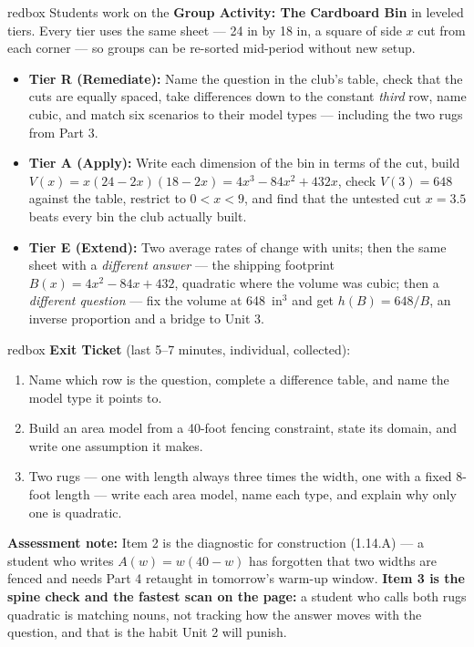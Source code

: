 \documentclass[10pt]{article}
\begin{document}
\begin{skillbox}{redbox}
Students work on the \textbf{Group Activity: The Cardboard Bin} in leveled
tiers. Every tier uses the same sheet --- 24 in by 18 in, a square of side $x$
cut from each corner --- so groups can be re-sorted mid-period without new
setup.

\begin{itemize}
  \item \textbf{Tier R (Remediate):} Name the question in the club's table,
        check that the cuts are equally spaced, take differences down to the
        constant \textit{third} row, name cubic, and match six scenarios to
        their model types --- including the two rugs from Part 3.
  \item \textbf{Tier A (Apply):} Write each dimension of the bin in terms of
        the cut, build $V(x) = x(24-2x)(18-2x) = 4x^3 - 84x^2 + 432x$, check
        $V(3) = 648$ against the table, restrict to $0 < x < 9$, and find that
        the untested cut $x = 3.5$ beats every bin the club actually built.
  \item \textbf{Tier E (Extend):} Two average rates of change with units; then
        the same sheet with a \textit{different answer} --- the shipping
        footprint $B(x) = 4x^2 - 84x + 432$, quadratic where the volume was
        cubic; then a \textit{different question} --- fix the volume at
        648~in$^3$ and get $h(B) = 648/B$, an inverse proportion and a bridge
        to Unit 3.
\end{itemize}
\end{skillbox}

\begin{skillbox}{redbox}
\textbf{Exit Ticket} (last 5--7 minutes, individual, collected):
\begin{enumerate}
  \item Name which row is the question, complete a difference table, and name
        the model type it points to.
  \item Build an area model from a 40-foot fencing constraint, state its
        domain, and write one assumption it makes.
  \item Two rugs --- one with length always three times the width, one with a
        fixed 8-foot length --- write each area model, name each type, and
        explain why only one is quadratic.
\end{enumerate}
\textbf{Assessment note:} Item 2 is the diagnostic for construction (1.14.A) ---
a student who writes $A(w) = w(40-w)$ has forgotten that two widths are fenced
and needs Part 4 retaught in tomorrow's warm-up window. \textbf{Item 3 is the
spine check and the fastest scan on the page:} a student who calls both rugs
quadratic is matching nouns, not tracking how the answer moves with the
question, and that is the habit Unit 2 will punish.
\end{skillbox}
\end{document}
